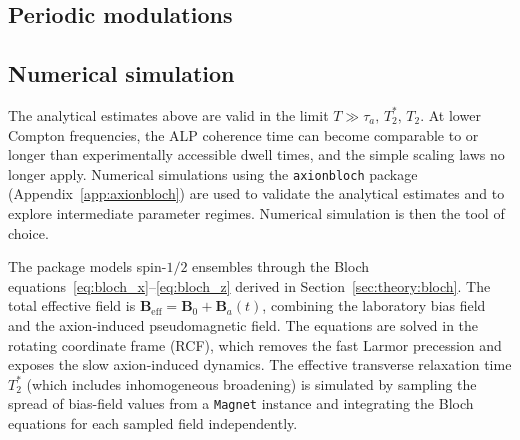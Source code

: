 \subsection{Periodic modulations}


\subsection{Numerical simulation}\label{sec:theory:simulation}

The analytical estimates above are valid in the limit $T \gg \tau_a,\,T_2^*,\,T_2$. At lower Compton frequencies, the ALP coherence time can become comparable to or longer than experimentally accessible dwell times, and the simple scaling laws no longer apply. Numerical simulations using the \texttt{axionbloch} package (Appendix~\ref{app:axionbloch}) are used to validate the analytical estimates and to explore intermediate parameter regimes.
Numerical simulation is then the tool of choice. 



The package models spin-$1/2$ ensembles through the Bloch equations~\eqref{eq:bloch_x}--\eqref{eq:bloch_z} derived in Section~\ref{sec:theory:bloch}. The total effective field is $\mathbf{B}_\mathrm{eff} = \mathbf{B}_0 + \mathbf{B}_a(t)$, combining the laboratory bias field and the axion-induced pseudomagnetic field. The equations are solved in the rotating coordinate frame (RCF), which removes the fast Larmor precession and exposes the slow axion-induced dynamics. The effective transverse relaxation time $T_2^*$ (which includes inhomogeneous broadening) is simulated by sampling the spread of bias-field values from a \texttt{Magnet} instance and integrating the Bloch equations for each sampled field independently.


